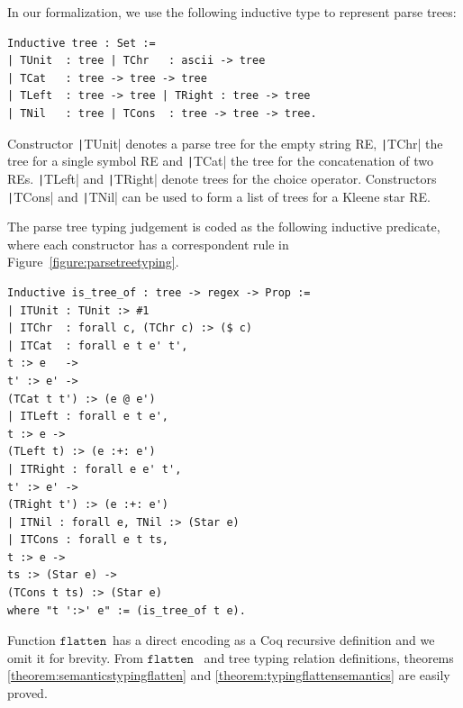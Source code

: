 \documentclass[oneside,12pt]{scrbook}
\theoremstyle{definition}
\newcommand{\flatten}{\ensuremath{\texttt{flatten}}}
\newcommand{\coq}[1]{\texttt|#1|}
\theoremstyle{plain}
\theoremstyle{definition}
\begin{document}
In our formalization, we use the following inductive type to represent parse
trees:

\begin{verbatim}
Inductive tree : Set :=
| TUnit  : tree | TChr   : ascii -> tree
| TCat   : tree -> tree -> tree 
| TLeft  : tree -> tree | TRight : tree -> tree 
| TNil   : tree | TCons  : tree -> tree -> tree.
\end{verbatim}

Constructor \coq{TUnit} denotes a parse tree for the empty string RE,
\coq{TChr} the tree for a single symbol RE and \coq{TCat} the tree for
the concatenation of two REs. \coq{TLeft} and \coq{TRight} denote trees
for the choice operator. Constructors \coq{TCons} and \coq{TNil} can be
used to form a list of trees for a Kleene star RE.

The parse tree typing judgement is
coded as the following inductive predicate, where each constructor
has a correspondent rule in Figure~\ref{figure:parsetreetyping}.

\begin{verbatim}
Inductive is_tree_of : tree -> regex -> Prop :=
| ITUnit : TUnit :> #1
| ITChr  : forall c, (TChr c) :> ($ c)
| ITCat  : forall e t e' t',
t :> e   ->
t' :> e' ->
(TCat t t') :> (e @ e')
| ITLeft : forall e t e',
t :> e ->
(TLeft t) :> (e :+: e')
| ITRight : forall e e' t',
t' :> e' ->
(TRight t') :> (e :+: e')
| ITNil : forall e, TNil :> (Star e)
| ITCons : forall e t ts,
t :> e ->
ts :> (Star e) ->
(TCons t ts) :> (Star e)
where "t ':>' e" := (is_tree_of t e).
\end{verbatim}
Function \flatten~has a direct encoding as a Coq recursive definition and
we omit it for brevity. From \flatten~ and tree typing relation definitions,
theorems \ref{theorem:semanticstypingflatten} and
\ref{theorem:typingflattensemantics} are easily proved.
\end{document}
